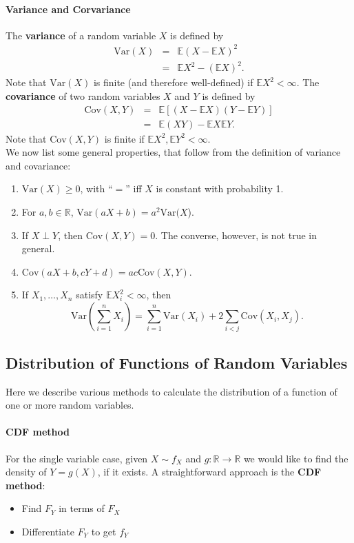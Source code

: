 \documentclass[12pt,oneside]{article}
\begin{document}
\paragraph{Variance and Corvariance}
The \textbf{variance} of a random variable $X$ is defined by
\begin{eqnarray*} \mbox{Var}(X) &=& \mathbb{E}(X-\mathbb{E}X)^2 \\ &=& \mathbb{E}X^2 - (\mathbb{E}X)^2 . \end{eqnarray*}
Note that $\mbox{Var}(X)$ is finite (and therefore well-defined) if $\mathbb{E}X^2 < \infty$.
The \textbf{covariance} of two random variables $X$ and $Y$ is defined by
\begin{eqnarray*} \mbox{Cov}(X,Y) &=& \mathbb{E}[(X- \mathbb{E}X)(Y - \mathbb{E}Y)] \\ &=& \mathbb{E}(XY) - \mathbb{E}X \mathbb{E}Y. \end{eqnarray*}
Note that $\mbox{Cov}(X,Y) $ is finite if $ \mathbb{E}X^2,  \mathbb{E}Y^2 < \infty$. \\

\noindent We now list some general properties, that follow from the definition of variance and covariance:
\begin{enumerate}
\item $\mbox{Var}(X) \geq 0$, with ``$=$'' iff $X$ is constant with probability 1.
\item For $a,b \in \mathbb{R}$, $\mbox{Var}(aX+b) = a^2 \mbox{Var}(X$).
\item If $X \perp Y$, then $\mbox{Cov}(X,Y) = 0$.  The converse, however, is not true in general.
\item $\mbox{Cov}(aX +b,cY+d) = ac \mbox{Cov}(X,Y)$.
\item If $X_1,\hdots,X_n$ satisfy $ \mathbb{E}X_i^2 < \infty$, then
\[\mbox{Var}(\displaystyle\sum\limits_{i=1}^n X_i) = \displaystyle\sum\limits_{i=1}^n \mbox{Var}(X_i) + 2 \displaystyle\sum\limits_{i<j} \mbox{Cov}(X_i,X_j).\]
\end{enumerate}

\subsection{Distribution of Functions of Random Variables}

Here we describe various methods to calculate the distribution of a function of one or more random variables. \\

\paragraph{CDF method}
 For the single variable case, given $X \sim f_X$ and $g: \mathbb{R} \rightarrow \mathbb{R}$ we would like to find the density of $Y=g(X)$, if it exists.  A straightforward approach is the \textbf{CDF method}:
\begin{itemize}
\item Find $F_Y$ in terms of $F_X$
\item Differentiate $F_Y$ to get $f_Y$
\end{itemize}
\end{document}
